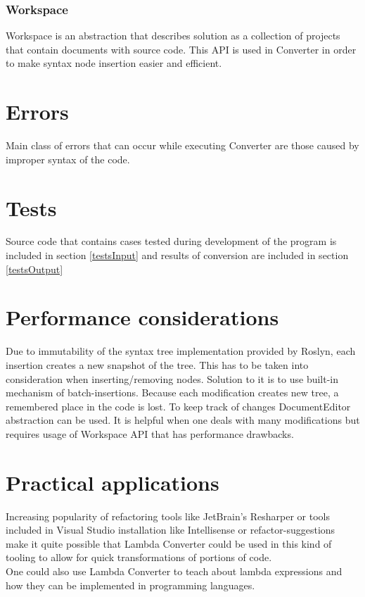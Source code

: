\documentclass[]{report}
\begin{document}
    \subsubsection{Workspace}
    Workspace is an abstraction that describes solution as a collection of projects that contain documents with source code. This API is used in Converter in order to make syntax node insertion easier and efficient.
    
    \section{Errors}
    Main class of errors that can occur while executing Converter are those caused by improper syntax of the code.  
    
    \section{Tests}
     Source code that contains cases tested during development of the program is included in section \ref{testsInput} and results of conversion are included in section \ref{testsOutput}
    
    
    \section{Performance considerations}
    Due to immutability of the syntax tree implementation provided by Roslyn, each insertion creates a new snapshot of the tree. This has to be taken into consideration when inserting/removing nodes. Solution to it is to use built-in mechanism of batch-insertions. Because each modification creates new tree, a remembered place in the code is lost. To keep track of changes DocumentEditor abstraction can be used. It is helpful when one deals with many modifications but requires usage of Workspace API that has performance drawbacks.
    
    \section{Practical applications}
    Increasing popularity of refactoring tools like JetBrain's Resharper or tools included in Visual Studio installation like Intellisense or refactor-suggestions make it quite possible that Lambda Converter could be used in this kind of tooling to allow for quick transformations of portions of code.
    \\
    One could also use Lambda Converter to teach about lambda expressions and how they can be implemented in programming languages. 
\end{document}
